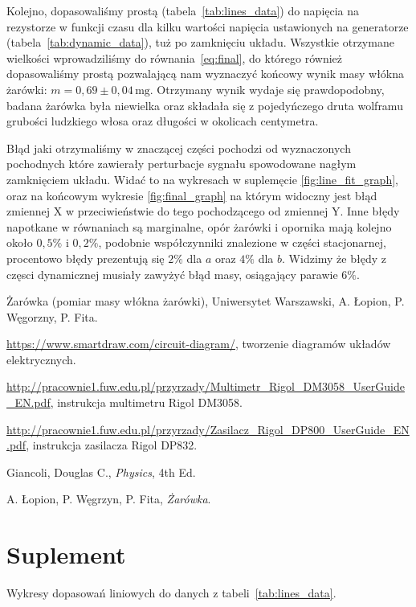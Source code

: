 \documentclass[12pt]{article}
\begin{document}
Kolejno, dopasowaliśmy prostą (tabela~\ref{tab:lines_data}) do napięcia na rezystorze w funkcji czasu dla kilku wartości napięcia ustawionych na generatorze (tabela~\ref{tab:dynamic_data}), tuż po zamknięciu układu. Wszystkie otrzymane wielkości wprowadziliśmy do równania~\eqref{eq:final}, do którego również dopasowaliśmy prostą pozwalającą nam wyznaczyć końcowy wynik masy włókna żarówki: $m=0{,}69\pm0{,}04\,\mathrm{mg}$. Otrzymany wynik wydaje się prawdopodobny, badana żarówka była niewielka oraz składała się z pojedyńczego druta wolframu grubości ludzkiego włosa oraz długości w okolicach centymetra.

Błąd jaki otrzymaliśmy w znaczącej części pochodzi od wyznaczonych pochodnych które zawierały perturbacje sygnału spowodowane nagłym zamknięciem układu. Widać to na wykresach w suplemęcie \ref{fig:line_fit_graph}, oraz na końcowym wykresie \ref{fig:final_graph} na którym widoczny jest błąd zmiennej X w przeciwieństwie do tego pochodzącego od zmiennej Y. Inne błędy napotkane w równaniach są marginalne, opór żarówki i opornika mają kolejno około $0{,}5 \%$ i $0{,}2 \%$, podobnie współczynniki znalezione w części stacjonarnej, procentowo błędy prezentują się $2\%$ dla $a$ oraz $4\%$ dla $b$. Widzimy że błędy z częsci dynamicznej musiały zawyżyć błąd masy, osiągający parawie $6\%$.


\newpage
\begin{thebibliography}{6}

Żarówka (pomiar masy włókna żarówki), Uniwersytet Warszawski, A. Łopion, P. Węgorzny, P. Fita.

\url{https://www.smartdraw.com/circuit-diagram/}, tworzenie diagramów układów elektrycznych.

\url{http://pracownie1.fuw.edu.pl/przyrzady/Multimetr_Rigol_DM3058_UserGuide_EN.pdf}, instrukcja multimetru Rigol DM3058.

\url{http://pracownie1.fuw.edu.pl/przyrzady/Zasilacz_Rigol_DP800_UserGuide_EN.pdf}, instrukcja zasilacza Rigol DP832.

Giancoli, Douglas C., \emph{Physics}, 4th Ed.

A. Łopion, P. Węgrzyn, P. Fita, \emph{Żarówka}.

\end{thebibliography}

\newpage

\section{Suplement}
Wykresy dopasowań liniowych do danych z tabeli~\ref{tab:lines_data}.
\end{document}
